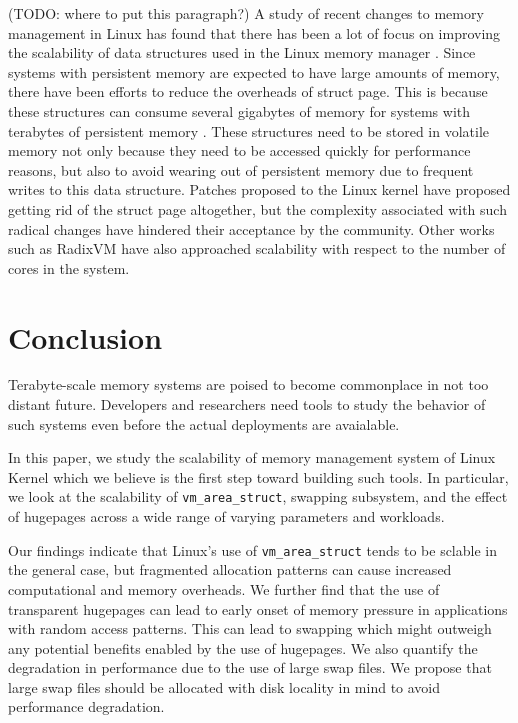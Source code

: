\documentclass[twocolumn,11pt]{article}
\begin{document}

(TODO: where to put this paragraph?)
A study of recent changes to memory management in Linux has found that there
has been a lot of focus on improving the scalability of data structures used in
the Linux memory manager \cite{huang2016evolutionary}. Since systems with
persistent memory are expected to have large amounts of memory, there have been
efforts to reduce the overheads of struct page. This is because these
structures can consume several gigabytes of memory for systems with terabytes
of persistent memory \cite{corbet_persistent_progress}. These structures need
to be stored in volatile memory not only because they need to be accessed
quickly for performance reasons, but also to avoid wearing out of persistent
memory due to frequent writes to this data structure. Patches proposed to the
Linux kernel have proposed getting rid of the struct page altogether, but the
complexity associated with such radical changes have hindered their acceptance
by the community. Other works such as RadixVM \cite{radixvm} have also
approached scalability with respect to the number of cores in the system.


\section{Conclusion}
Terabyte-scale memory systems are poised to become commonplace in not too distant future.
Developers and researchers need tools to study the behavior of such systems even before the actual
deployments are avaialable. 

In this paper, we study the scalability of memory management 
system of Linux Kernel which we believe is the first step toward building such tools. In particular, 
we look at the scalability of \texttt{vm\_area\_struct},  
swapping subsystem, and the effect of hugepages across a wide range of varying parameters
and workloads. 

Our findings indicate that Linux's use of
\texttt{vm\_area\_struct} tends to be sclable in the general case, but
fragmented allocation patterns can cause increased computational and memory
overheads. We further find that the use of 
transparent hugepages can lead to early onset of memory pressure in applications
with random access patterns. 
This can lead to swapping which might outweigh any potential benefits enabled by the use of hugepages. 
We also quantify the degradation in performance due to the use of large swap
files. We propose that large swap files should be allocated with disk locality
in mind to avoid performance degradation.   
\end{document}
